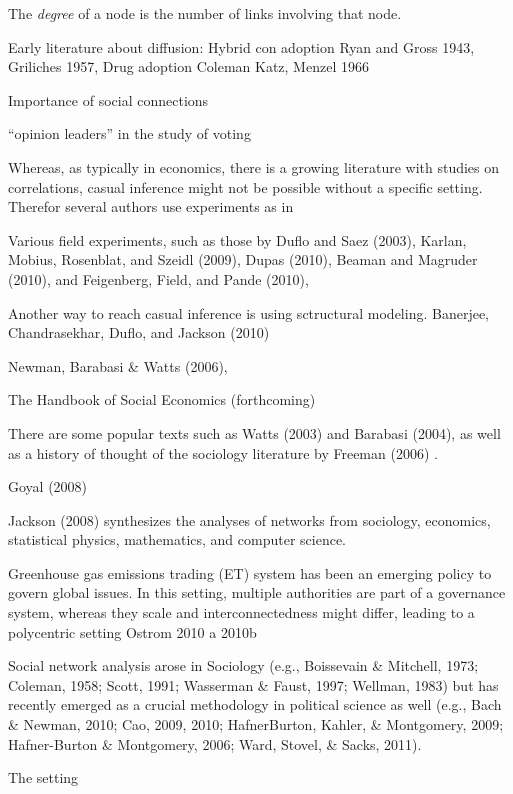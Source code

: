 \documentclass[
  letterpaper,
  DIV=11,
  numbers=noendperiod]{scrartcl}
\begin{document}
The \emph{degree} of a node is the number of links involving that node.

Early literature about diffusion: Hybrid con adoption Ryan and Gross
1943, Griliches 1957, Drug adoption Coleman Katz, Menzel 1966

Importance of social connections

``opinion leaders'' in the study of voting

Whereas, as typically in economics, there is a growing literature with
studies on correlations, casual inference might not be possible without
a specific setting. Therefor several authors use experiments as in

Various field experiments, such as those by Duflo and Saez (2003),
Karlan, Mobius, Rosenblat, and Szeidl (2009), Dupas (2010), Beaman and
Magruder (2010), and Feigenberg, Field, and Pande (2010),

Another way to reach casual inference is using sctructural modeling.
Banerjee, Chandrasekhar, Duflo, and Jackson (2010)

Newman, Barabasi \& Watts (2006),

The Handbook of Social Economics (forthcoming)

There are some popular texts such as Watts (2003) and Barabasi (2004),
as well as a history of thought of the sociology literature by Freeman
(2006) .

Goyal (2008)

Jackson (2008) synthesizes the analyses of networks from sociology,
economics, statistical physics, mathematics, and computer science.

Greenhouse gas emissions trading (ET) system has been an emerging policy
to govern global issues. In this setting, multiple authorities are part
of a governance system, whereas they scale and interconnectedness might
differ, leading to a polycentric setting Ostrom 2010 a 2010b

Social network analysis arose in Sociology (e.g., Boissevain \&
Mitchell, 1973; Coleman, 1958; Scott, 1991; Wasserman \& Faust, 1997;
Wellman, 1983) but has recently emerged as a crucial methodology in
political science as well (e.g., Bach \& Newman, 2010; Cao, 2009, 2010;
HafnerBurton, Kahler, \& Montgomery, 2009; Hafner-Burton \& Montgomery,
2006; Ward, Stovel, \& Sacks, 2011).

The setting
\end{document}
